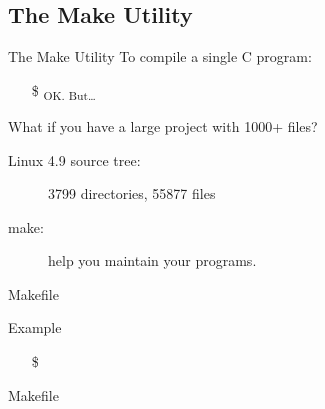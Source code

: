 \subsection{The Make Utility}

\begin{frame}{The Make Utility}
  To compile a single C program:
  \begin{itemize}
  \item[\$] \quad{\Huge \correct}\textsubscript{{\tiny OK. But\ldots}}
  \end{itemize}
  \begin{iblock}{What if you have a large project with 1000+ files?}
    \begin{center}
    \end{center}
    \begin{description}
    \item[Linux 4.9 source tree:] 3799 directories, 55877 files
    \end{description}
  \end{iblock}
  \begin{description}
  \item[make:] help you maintain your programs.
  \end{description}
\end{frame}

\begin{frame}{Makefile}
  \begin{iblock}{}
  \end{iblock}
  \begin{iblock}{Example}
  \end{iblock}
  \begin{itemize}
  \item[\$] 
  \end{itemize}
\end{frame}

\begin{frame}{Makefile}
  \begin{minipage}{.75\linewidth}
  \end{minipage}
  \begin{minipage}{.2\linewidth}
    \begin{center}
    \end{center}
  \end{minipage}
\end{frame}

